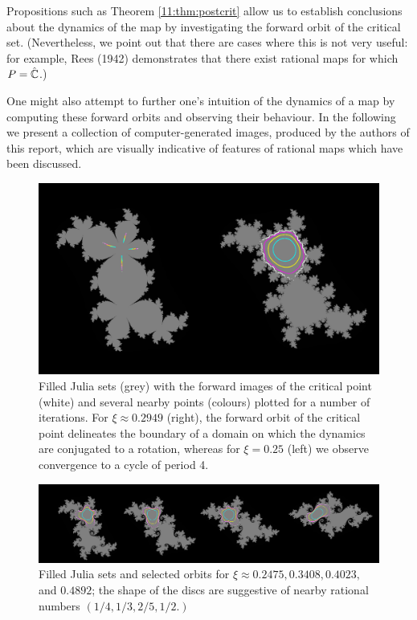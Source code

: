 \documentclass[../main.tex]{subfiles}
\newcommand\postcrit{P}
\begin{document}
Propositions such as Theorem \ref{11:thm:postcrit} allow us to establish conclusions about the dynamics of the map by investigating the forward orbit of the critical set. (Nevertheless, we point out that there are cases where this is not very useful: for example, Rees (1942) demonstrates that there exist rational maps for which $\postcrit = \hat{\C}$.)

One might also attempt to further one's intuition of the dynamics of a map by computing these forward orbits and observing their behaviour. In the following we present a collection of computer-generated images, produced by the authors of this report, which are visually indicative of features of rational maps which have been discussed.

\begin{figure}[ht]
\includegraphics[width=\textwidth]{resources/ch-11/siegel/parabolic-and-siegel.png}
\caption{Filled Julia sets (grey) with the forward images of the critical point (white) and several nearby points (colours) plotted for a number of iterations. For $\xi \approx 0.2949$ (right), the forward orbit of the critical point delineates the boundary of a domain on which the dynamics are conjugated to a rotation, whereas for $\xi = 0.25$ (left) we observe convergence to a cycle of period 4.}
\end{figure}

\begin{figure}[ht]
\includegraphics[width=\textwidth]{resources/ch-11/siegel/siegel-sequence.png}
\caption{Filled Julia sets and selected orbits for $\xi \approx 0.2475, 0.3408, 0.4023,$ and $0.4892$; the shape of the discs are suggestive of nearby rational numbers $(1/4, 1/3, 2/5, 1/2.)$}
\end{figure}
\end{document}
